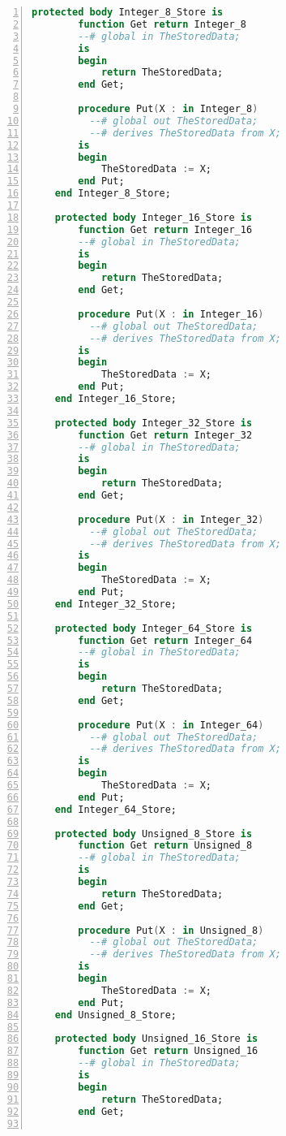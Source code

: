 \begin{lstlisting}[language=ada, gobble=0, numbers=left, caption={\lstinline{Base_Types} package}, label={listing:pca_generated:base_types}]
    protected body Integer_8_Store is
        function Get return Integer_8
        --# global in TheStoredData;
        is
        begin
            return TheStoredData;
        end Get;

        procedure Put(X : in Integer_8)
          --# global out TheStoredData;
          --# derives TheStoredData from X;
        is
        begin
            TheStoredData := X;
        end Put;
    end Integer_8_Store;

    protected body Integer_16_Store is
        function Get return Integer_16
        --# global in TheStoredData;
        is
        begin
            return TheStoredData;
        end Get;

        procedure Put(X : in Integer_16)
          --# global out TheStoredData;
          --# derives TheStoredData from X;
        is
        begin
            TheStoredData := X;
        end Put;
    end Integer_16_Store;

    protected body Integer_32_Store is
        function Get return Integer_32
        --# global in TheStoredData;
        is
        begin
            return TheStoredData;
        end Get;

        procedure Put(X : in Integer_32)
          --# global out TheStoredData;
          --# derives TheStoredData from X;
        is
        begin
            TheStoredData := X;
        end Put;
    end Integer_32_Store;

    protected body Integer_64_Store is
        function Get return Integer_64
        --# global in TheStoredData;
        is
        begin
            return TheStoredData;
        end Get;

        procedure Put(X : in Integer_64)
          --# global out TheStoredData;
          --# derives TheStoredData from X;
        is
        begin
            TheStoredData := X;
        end Put;
    end Integer_64_Store;

    protected body Unsigned_8_Store is
        function Get return Unsigned_8
        --# global in TheStoredData;
        is
        begin
            return TheStoredData;
        end Get;

        procedure Put(X : in Unsigned_8)
          --# global out TheStoredData;
          --# derives TheStoredData from X;
        is
        begin
            TheStoredData := X;
        end Put;
    end Unsigned_8_Store;

    protected body Unsigned_16_Store is
        function Get return Unsigned_16
        --# global in TheStoredData;
        is
        begin
            return TheStoredData;
        end Get;


\end{lstlisting}
